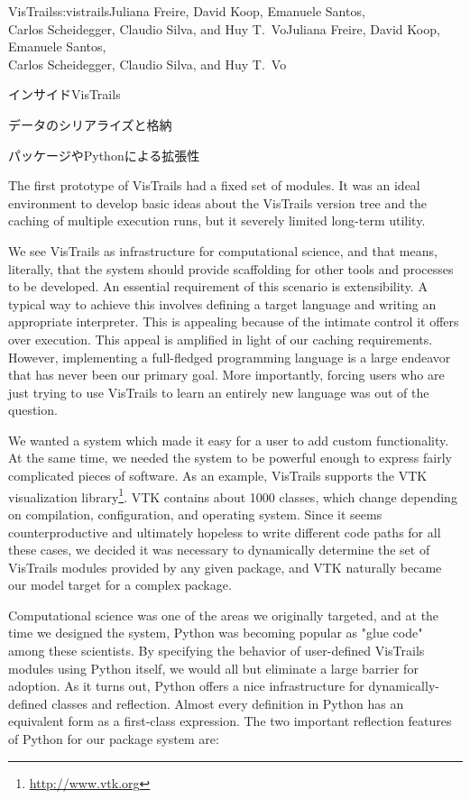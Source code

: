 \begin{aosachaptertoc}{VisTrails}{s:vistrails}{Juliana Freire, David Koop, Emanuele Santos, \\ Carlos Scheidegger, Claudio Silva, and Huy T.\ Vo}{Juliana Freire, David Koop, Emanuele Santos, \\ \hspace*{0.9cm} Carlos Scheidegger, Claudio Silva, and Huy T.\ Vo}
\begin{aosasect1}{インサイドVisTrails}
\begin{aosasect2}{データのシリアライズと格納}
\end{aosasect2}

\begin{aosasect2}{パッケージやPythonによる拡張性}
\label{sec.vistrails.packages}

The first prototype of VisTrails had a fixed set of modules. It was an
ideal environment to develop basic ideas about the VisTrails version
tree and the caching of multiple execution runs, but it severely
limited long-term utility.

We see VisTrails as infrastructure for computational science, and that
means, literally, that the system should provide scaffolding for other
tools and processes to be developed. An essential requirement of this
scenario is extensibility.  A typical way to achieve this involves
defining a target language and writing an appropriate
interpreter. This is appealing because of the intimate control it
offers over execution. This appeal is amplified in light of our
caching requirements.  However, implementing a full-fledged
programming language is a large endeavor that has never been our
primary goal. More importantly, forcing users who are just trying to
use VisTrails to learn an entirely new language was out of the
question.

We wanted a system which made it easy for a user to add custom
functionality. At the same time, we needed the system to be powerful
enough to express fairly complicated pieces of software. As an
example, VisTrails supports the VTK visualization library\footnote{\url{http://www.vtk.org}}. VTK
contains about 1000 classes, which change depending on compilation,
configuration, and operating system. Since it seems counterproductive
and ultimately hopeless to write different code paths for all these
cases, we decided it was necessary to dynamically determine the set of
VisTrails modules provided by any given package, and VTK naturally
became our model target for a complex package.

Computational science was one of the areas we originally targeted, and
at the time we designed the system, Python was becoming popular as
"glue code" among these scientists. By specifying the behavior of
user-defined VisTrails modules using Python itself, we would all but
eliminate a large barrier for adoption.  As it turns out, Python
offers a nice infrastructure for dynamically-defined classes and
reflection. Almost every definition in Python has an equivalent form
as a first-class expression. The two important reflection features of
Python for our package system are:


\end{aosasect2}
\end{aosasect1}
\end{aosachaptertoc}
